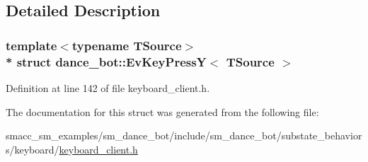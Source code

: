 \subsection{Detailed Description}
\subsubsection*{template$<$typename T\+Source$>$\\*
struct dance\+\_\+bot\+::\+Ev\+Key\+Press\+Y$<$ T\+Source $>$}



Definition at line 142 of file keyboard\+\_\+client.\+h.



The documentation for this struct was generated from the following file\+:\begin{DoxyCompactItemize}
\item 
smacc\+\_\+sm\+\_\+examples/sm\+\_\+dance\+\_\+bot/include/sm\+\_\+dance\+\_\+bot/substate\+\_\+behaviors/keyboard/\hyperlink{keyboard__client_8h}{keyboard\+\_\+client.\+h}\end{DoxyCompactItemize}
